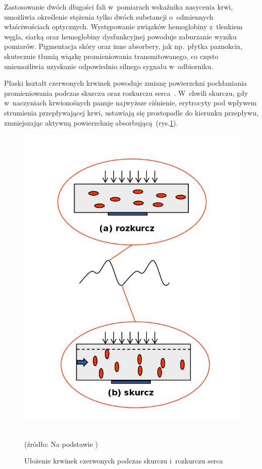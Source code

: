 Zastosowanie dwóch długości fali w~pomiarach wskaźnika nasycenia krwi, umożliwia określenie stężenia tylko dwóch substancji o~odmiennych właściwościach optycznych. Występowanie związków
hemoglobiny z~tlenkiem węgla, siarką oraz hemoglobiny dysfunkcyjnej powoduje zaburzanie wyniku pomiarów.
Pigmentacja skóry oraz inne absorbery, jak np.~płytka paznokcia, skutecznie tłumią wiązkę promieniowania transmitowanego, co często uniemożliwia uzyskanie odpowiednio silnego sygnału w~odbiorniku.

Płaski kształt czerwonych krwinek powoduje zmianę powierzchni pochłaniania promieniowania podczas skurczu oraz rozkurczu serca~\cite{Fuzzy:2011}. W~chwili skurczu, gdy w~naczyniach 
krwionośnych panuje najwyższe ciśnienie, erytrocyty pod wpływem strumienia przepływającej krwi, ustawiają się prostopadle do kierunku przepływu, zmniejszając aktywną powierzchnię 
absorbującą~(rys.\ref{rys:sysdias}).

\begin{figure}[ht]
\centerline{\includegraphics[scale = 0.40]{graphic/sysdias}}
	\caption{Ułożenie krwinek czerwonych podczas skurczu i~rozkurczu serca}
	\label{rys:sysdias}
	~\\
	(źródło: Na podstawie \cite{Fuzzy:2011})
\end{figure}

